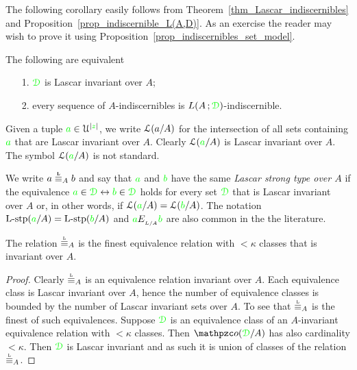 \documentclass[creche.tex]{subfiles}
\begin{document}
The following corollary easily follows from Theorem~\ref{thm_Lascar_indiscernibles} and Proposition~\ref{prop_indiscernible_L(A,D)}. As an exercise the reader may wish to prove it using Proposition~\ref{prop_indiscernibles_set_model}.
 
\begin{corollary}
The following are equivalent
\begin{itemize}
\item[1.] ${\color{green}\EuScript D}$ is Lascar invariant over $A$;
\item[2.] every sequence of $A$-indiscernibles is $L(A\,;{\color{green}\EuScript D})$-indiscernible.\QED
\end{itemize}
\end{corollary}

\noindent\llap{\textcolor{red}{\Large\danger}
\kern1.5ex}Given a tuple ${\color{green} a}\in\EuScript U^{|{\color{green} z}|}$, we write \emph{$\EuScript L(a/A)$\/} for the intersection of all sets containing ${\color{green} a}$ that are Lascar invariant over $A$. Clearly $\EuScript L({\color{green} a}/A)$ is Lascar invariant over $A$. The symbol $\EuScript L({\color{green} a}/A)$ is not standard.

\begin{definition}\label{def_Lascar_type}We write \emph{$a\stackrel{\smash{\scalebox{.5}{\rm\bf L}}}{\equiv}_Ab$\/} and say that ${\color{green} a}$ and ${\color{green} b}$ have the same \emph{Lascar strong type over $A$\/} if the equivalence ${\color{green} a}\in{\color{green}\EuScript D}\leftrightarrow{\color{green}b}\in{\color{green}\EuScript D}$ holds for every set ${\color{green}\EuScript D}$ that is Lascar invariant over $A$ or, in other words, if $\EuScript L({\color{green} a}/A)=\EuScript L({\color{green} b}/A)$. The notation ${\rm L{\mbox{-}}stp}({\color{green} a}/A)={\rm L{\mbox{-}}stp}({\color{green} b}/A)$ and ${\color{green} a}E_{_{L/A}}{\color{green} b}$ are also common in the the literature.\QED
\end{definition}




\begin{proposition}
  The relation $\equivL_A$ is the finest equivalence relation with $<\kappa$ classes that is invariant over $A$.\QED
\end{proposition}

\begin{proof}
  Clearly $\equivL_A$ is an equivalence relation invariant over $A$. Each equivalence class is Lascar invariant over $A$, hence the number of equivalence classes is bounded by the number of Lascar invariant sets over $A$. To see that $\equivL_A$ is the finest of such equivalences. Suppose ${\color{green}\EuScript D}$ is an equivalence class of an $A$-invariant equivalence relation with $<\kappa$ classes. Then $\oorbit(\grD/A)$ has also cardinality $<\kappa$. Then ${\color{green}\EuScript D}$ is Lascar invariant and as such it is union of classes of the relation $\equivL_A$. 
\end{proof}
\end{document}
